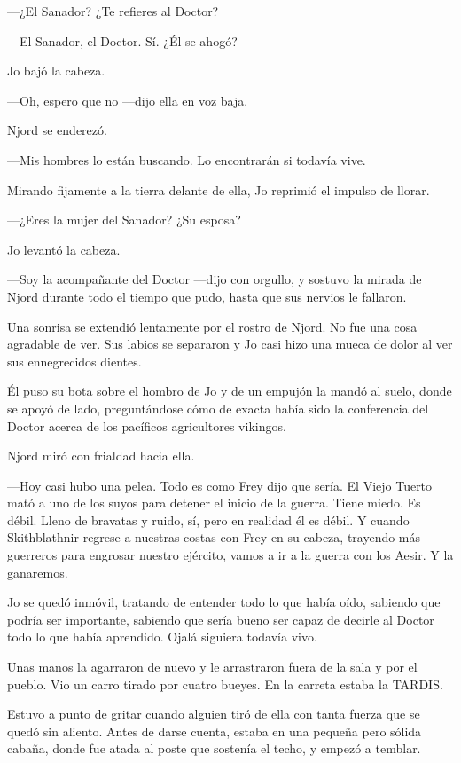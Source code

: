 ---¿El Sanador? ¿Te refieres al Doctor?

---El Sanador, el Doctor. Sí. ¿Él se ahogó?

Jo bajó la cabeza.

---Oh, espero que no ---dijo ella en voz baja.

Njord se enderezó.

---Mis hombres lo están buscando. Lo encontrarán si todavía vive.

Mirando fijamente a la tierra delante de ella, Jo reprimió el impulso de
llorar.

---¿Eres la mujer del Sanador? ¿Su esposa?

Jo levantó la cabeza.

---Soy la acompañante del Doctor ---dijo con orgullo, y sostuvo la
mirada de Njord durante todo el tiempo que pudo, hasta que sus nervios
le fallaron.

Una sonrisa se extendió lentamente por el rostro de Njord. No fue una
cosa agradable de ver. Sus labios se separaron y Jo casi hizo una mueca
de dolor al ver sus ennegrecidos dientes.

Él puso su bota sobre el hombro de Jo y de un empujón la mandó al suelo,
donde se apoyó de lado, preguntándose cómo de exacta había sido la
conferencia del Doctor acerca de los pacíficos agricultores vikingos.

Njord miró con frialdad hacia ella.

---Hoy casi hubo una pelea. Todo es como Frey dijo que sería. El Viejo
Tuerto mató a uno de los suyos para detener el inicio de la guerra.
Tiene miedo. Es débil. Lleno de bravatas y ruido, sí, pero en realidad
él es débil. Y cuando Skithblathnir regrese a nuestras costas con Frey
en su cabeza, trayendo más guerreros para engrosar nuestro ejército,
vamos a ir a la guerra con los Aesir. Y la ganaremos.

Jo se quedó inmóvil, tratando de entender todo lo que había oído,
sabiendo que podría ser importante, sabiendo que sería bueno ser capaz
de decirle al Doctor todo lo que había aprendido. Ojalá siguiera todavía
vivo.

Unas manos la agarraron de nuevo y le arrastraron fuera de la sala y por
el pueblo. Vio un carro tirado por cuatro bueyes. En la carreta estaba
la TARDIS.

Estuvo a punto de gritar cuando alguien tiró de ella con tanta fuerza
que se quedó sin aliento. Antes de darse cuenta, estaba en una pequeña
pero sólida cabaña, donde fue atada al poste que sostenía el techo, y
empezó a temblar.